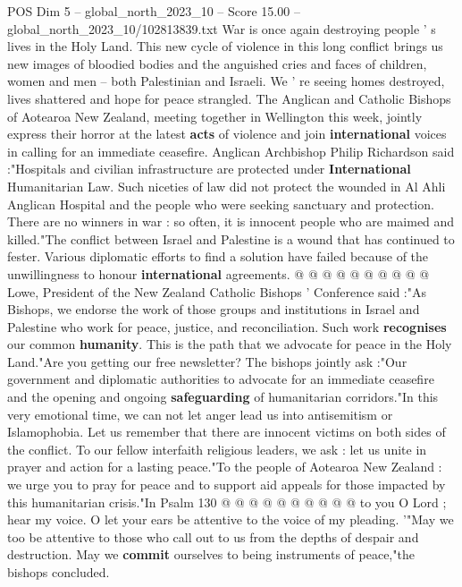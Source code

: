 \begin{textsample}{POS Dim 5 – global\_north\_2023\_10 – Score 15.00 – global\_north\_2023\_10/102813839.txt}  \label{ex:f5_pos_421}
War is once again destroying people ' s lives in the Holy Land.
This new cycle of violence in this long conflict brings us new images of bloodied bodies and the anguished cries and faces of children, women and men -- both Palestinian and Israeli.
We ' re seeing homes destroyed, lives shattered and hope for peace strangled.
The Anglican and Catholic Bishops of Aotearoa New Zealand, meeting together in Wellington this week, jointly express their horror at the latest \textbf{acts} of violence and join \textbf{international} voices in calling for an immediate ceasefire.
Anglican Archbishop Philip Richardson said :"Hospitals and civilian infrastructure are protected under \textbf{International} Humanitarian Law.
Such niceties of law did not protect the wounded in Al Ahli Anglican Hospital and the people who were seeking sanctuary and protection.
There are no winners in war : so often, it is innocent people who are maimed and killed."The conflict between Israel and Palestine is a wound that has continued to fester.
Various diplomatic efforts to find a solution have failed because of the unwillingness to honour \textbf{international} agreements. @ @ @ @ @ @ @ @ @ @ Lowe, President of the New Zealand Catholic Bishops ' Conference said :"As Bishops, we endorse the work of those groups and institutions in Israel and Palestine who work for peace, justice, and reconciliation.
Such work \textbf{recognises} our common \textbf{humanity}.
This is the path that we advocate for peace in the Holy Land."Are you getting our free newsletter?
The bishops jointly ask :"Our government and diplomatic authorities to advocate for an immediate ceasefire and the opening and ongoing \textbf{safeguarding} of humanitarian corridors."In this very emotional time, we can not let anger lead us into antisemitism or Islamophobia.
Let us remember that there are innocent victims on both sides of the conflict.
To our fellow interfaith religious leaders, we ask : let us unite in prayer and action for a lasting peace."To the people of Aotearoa New Zealand : we urge you to pray for peace and to support aid appeals for those impacted by this humanitarian crisis."In Psalm 130 @ @ @ @ @ @ @ @ @ @ to you O Lord ; hear my voice.
O let your ears be attentive to the voice of my pleading. '"May we too be attentive to those who call out to us from the depths of despair and destruction.
May we \textbf{commit} ourselves to being instruments of peace,"the bishops concluded.

\end{textsample}

